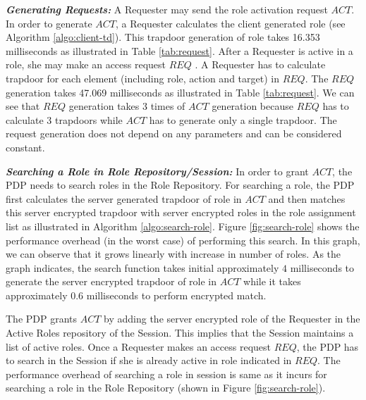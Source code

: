 \documentclass[final,5p,times,twocolumn]{elsarticle}
\begin{document}
\emph{\textbf{Generating Requests:}}
A Requester may send the role activation request $\mathit{ACT}$. In order to generate $\mathit{ACT}$, a Requester calculates the client generated role (see Algorithm \ref{algo:client-td}). This trapdoor generation of role takes 16.353 milliseconds as illustrated in Table \ref{tab:request}. After a Requester is active in a role, she may make an access request $\mathit{REQ}$ . A Requester has to calculate trapdoor for each element (including role, action and target) in $\mathit{REQ}$. The $\mathit{REQ}$ generation takes 47.069 milliseconds as illustrated in Table \ref{tab:request}. We can see that $\mathit{REQ}$ generation takes 3 times of $\mathit{ACT}$ generation because $\mathit{REQ}$ has to calculate 3 trapdoors while $\mathit{ACT}$ has to generate only a single trapdoor. The request generation does not depend on any parameters and can be considered constant.

\emph{\textbf{Searching a Role in Role Repository/Session:}}
In order to grant $\mathit{ACT}$, the PDP needs to search roles in the Role Repository. For searching a role, the PDP first calculates the server generated trapdoor of role in $\mathit{ACT}$ and then matches this server encrypted trapdoor with server encrypted roles in the role assignment list as illustrated in Algorithm \ref{algo:search-role}. Figure \ref{fig:search-role} shows the performance overhead (in the worst case) of performing this search. In this graph, we can observe that it grows linearly with increase in number of roles. As the graph indicates, the search function takes initial approximately $4$ milliseconds to generate the server encrypted trapdoor of role in $\mathit{ACT}$ while it takes approximately $0.6$ milliseconds to perform encrypted match.

The PDP grants $\mathit{ACT}$ by adding the server encrypted role of the Requester in the Active Roles repository of the Session. This implies that the Session maintains a list of active roles. Once a Requester makes an access request $\mathit{REQ}$, the PDP has to search in the Session if she is already active in role indicated in $\mathit{REQ}$. The performance overhead of searching a role in session is same as it incurs for searching a role in the Role Repository (shown in Figure \ref{fig:search-role}).
\end{document}

